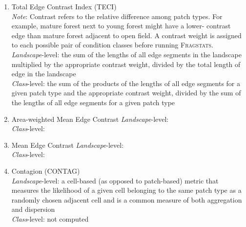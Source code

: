 \begin{enumerate}
	\item Total Edge Contrast Index (TECI) \\
	\label{item:TECI}
	\emph{Note}: Contrast refers to the relative difference among patch types. For example, mature forest next to young forest might have a lower-
contrast edge than mature forest adjacent to open field. A contrast weight is assigned to each possible pair of condition classes before 
running \textsc{Fragstats}. 	\\
	\emph{Landscape}-level: the sum of the lengths of all edge segments in the landscape multiplied by the appropriate contrast weight, divided by 
the total length of edge in the landscape\\
	\emph{Class}-level: the sum of the products of the lengths of all edge segments for a given patch type and the appropriate contrast weight, 
divided by the sum of the lengths of all edge segments for a given patch type \\

	\item Area-weighted Mean Edge Contrast
	\label{item:ECONAM}
	\emph{Landscape}-level:      \\
	\emph{Class}-level:         \\

	\item Mean Edge Contrast
	\label{item:ECONMN}
	\emph{Landscape}-level:      \\
	\emph{Class}-level:         \\

	
	\item Contagion (CONTAG)\\
	\emph{Landscape}-level: a cell-based (as opposed to patch-based) metric that measures the likelihood of a given cell belonging to the same patch type as a randomly chosen adjacent cell and is a common measure of both aggregation and dispersion 	\\
	\emph{Class}-level: not computed \\ 	


\end{enumerate}
